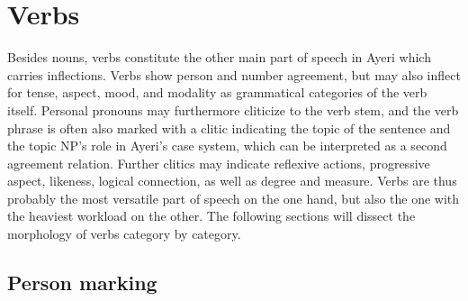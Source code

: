 
\section{Verbs}
\label{sec:verbs}

Besides nouns, verbs constitute the other main part of speech in Ayeri which
carries inflections. Verbs show person and number agreement, but may also
inflect for tense, aspect, mood, and modality as grammatical categories of the
verb itself. Personal pronouns may furthermore cliticize to the verb stem, and
the verb phrase is often also marked with a clitic indicating the topic of the
sentence and the topic NP's role in Ayeri's case system, which can be
interpreted as a second agreement relation. Further clitics may indicate
reflexive actions, progressive aspect, likeness, logical connection, as well
as degree and measure. Verbs are thus probably the most versatile part of
speech on the one hand, but also the one with the heaviest workload on the
other. The following sections will dissect the morphology of verbs category by
category.

\subsection{Person marking}
\label{subsec:persnumagr}

